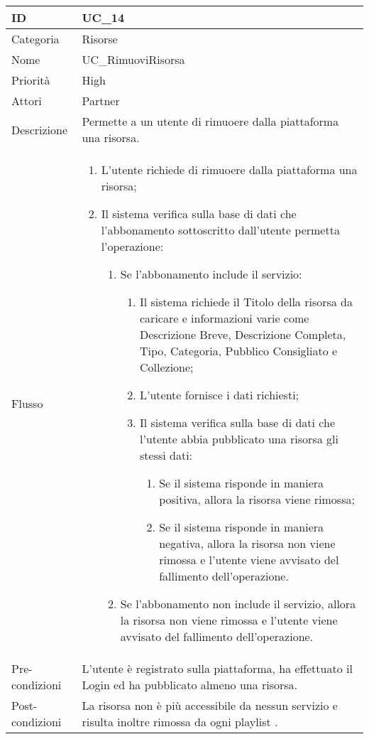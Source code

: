 \begin{center}
\begin{tabular}{ |p{2cm}|p{13cm}|  }
\hline
ID & UC\_14 \\\hline
Categoria & Risorse\\\hline
Nome & UC\_RimuoviRisorsa\\\hline
Priorità & High \\\hline
Attori &  Partner \\\hline
Descrizione & Permette a un utente di rimuoere dalla piattaforma una risorsa.\\\hline
Flusso &  	\begin{enumerate}
			\item L'utente richiede di rimuoere dalla piattaforma una risorsa;
			\item Il sistema verifica sulla base di dati che l'abbonamento sottoscritto dall'utente permetta l'operazione:
			\begin{enumerate}
				\item Se l'abbonamento include il servizio:
				\begin{enumerate}
					\item Il sistema richiede il Titolo della risorsa da caricare e informazioni varie come Descrizione Breve,  Descrizione Completa, Tipo, Categoria, Pubblico Consigliato e Collezione;
					\item L'utente fornisce i dati richiesti;
					\item Il sistema verifica sulla base di dati che l'utente abbia pubblicato una risorsa gli stessi dati:
					\begin{enumerate}
						\item Se il sistema risponde in maniera positiva, allora la risorsa viene rimossa;
						\item Se il sistema risponde in maniera negativa, allora  la risorsa non viene rimossa e l'utente viene avvisato del fallimento dell'operazione.
					\end{enumerate}
				\end{enumerate}
				\item Se l'abbonamento non include il servizio, allora la risorsa non viene rimossa e l'utente viene avvisato del fallimento dell'operazione.
			\end{enumerate}
		\end{enumerate}\\\hline
Pre-condizioni & L'utente è registrato sulla piattaforma, ha effettuato il Login ed ha pubblicato almeno una risorsa.\\\hline
Post-condizioni & La risorsa non è più accessibile da nessun servizio e risulta inoltre rimossa da ogni playlist .\\\hline
\end{tabular}
\label{table_use_case:14}\newline


\end{center}
